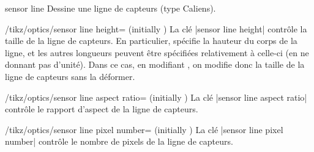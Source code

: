 \documentclass[a4paper]{ltxdoc}
\begin{document}
\begin{shape}{sensor line}
Dessine une ligne de capteurs (type Caliens).

\begin{codeexample}[width=6cm]
\end{codeexample}

\begin{key}{/tikz/optics/sensor line height= (initially )}
    La clé |sensor line height| contrôle la taille de la ligne de capteurs. En particulier,  spécifie la hauteur du corps de la ligne,
    et les autres longueurs peuvent être spécifiées relativement à celle-ci (en ne donnant pas d'unité). Dans ce cas, en modifiant , on modifie donc la taille de la ligne de capteurs
    sans la déformer.

    \begin{codeexample}[]
    \end{codeexample}
\end{key}

\begin{key}{/tikz/optics/sensor line aspect ratio= (initially )}
    La clé |sensor line aspect ratio| contrôle le rapport d'aspect de la ligne de capteurs.

    \begin{codeexample}[]
    \end{codeexample}
\end{key}


\begin{key}{/tikz/optics/sensor line pixel number= (initially )}
    La clé |sensor line pixel number| contrôle le nombre de pixels  de la ligne de capteurs.


\end{key}
\end{shape}
\end{document}
